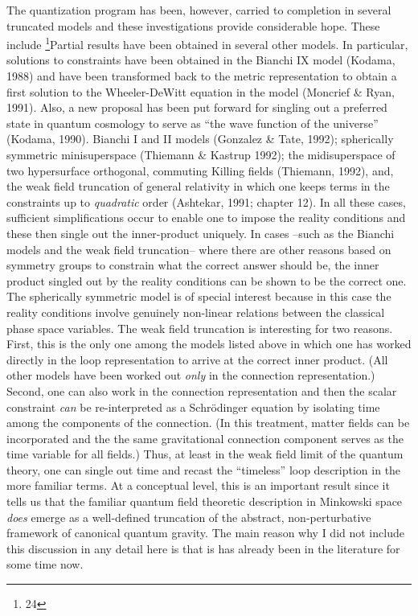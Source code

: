 The quantization program has been, however, carried to completion in several
truncated models and these investigations provide considerable hope.
These include%
\footnote{24}{Partial results have been obtained in several other models.
In particular, solutions to constraints have been obtained in the Bianchi
IX model (Kodama, 1988) and have been transformed back to the metric
representation to obtain a first solution to the Wheeler-DeWitt equation
in the model (Moncrief \& Ryan, 1991). Also, a new proposal has been
put forward for singling out a preferred state in quantum cosmology to
serve as ``the wave function of the universe'' (Kodama, 1990).}
Bianchi I and II models (Gonzalez \& Tate, 1992); spherically
symmetric minisuperspace (Thiemann \& Kastrup 1992); the midisuperspace
of two hypersurface orthogonal, commuting Killing fields (Thiemann, 1992),
and, the weak field truncation of general relativity in which one keeps
terms in the constraints up to {\it quadratic} order (Ashtekar, 1991;
chapter 12). In
all these cases, sufficient simplifications occur to enable one to impose
the reality conditions and these then single out the inner-product
uniquely. In cases --such as the Bianchi models and the weak field
truncation-- where there are other reasons based on symmetry groups to
constrain what the correct answer should be, the inner product singled
out by the reality conditions can be shown to be the correct one. The
spherically symmetric model is of special interest because in this case
the reality conditions involve genuinely non-linear relations between the
classical phase space variables. The weak field truncation is interesting
for two reasons. First, this is the only one among the models listed above
in which one has worked directly in the loop representation to arrive at
the correct inner product. (All other models have been worked out {\it only}
in the connection representation.) Second, one can also work in the connection
representation and then the scalar constraint {\it can} be re-interpreted
as a Schr\"odinger equation by isolating time among the components of the
connection. (In this treatment, matter fields can be incorporated and the
the same gravitational connection component serves as the time variable for
all fields.) Thus, at least in the weak field limit of the quantum theory,
one can single out time and recast the ``timeless'' loop description in
the more familiar terms. At a conceptual level, this is an important result
since it tells us that the familiar quantum field theoretic description in
Minkowski space {\it does} emerge as a well-defined truncation of the abstract,
non-perturbative framework of canonical quantum gravity. The main reason why
I did not include this discussion in any detail here is that is has already
been in the literature for some time now.

